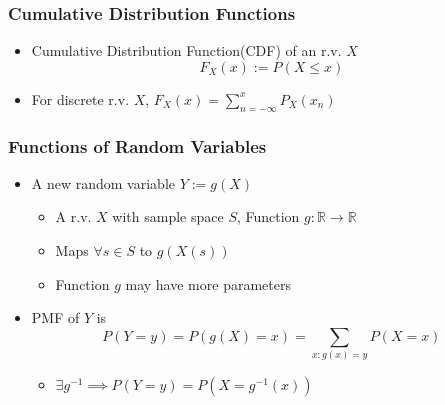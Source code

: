 \subsubsection*{Cumulative Distribution Functions}
\begin{itemize}
    \item Cumulative Distribution Function(CDF) of an r.v. $X$
    \begin{equation}
        F_X(x):=P(X\leq x)
    \end{equation}
    \item For discrete r.v. $X$, $F_X(x)=\sum_{n=-\infty}^{x}P_X(x_n)$
\end{itemize}

\subsubsection*{Functions of Random Variables}
\begin{itemize}
    \item A new random variable $Y:=g(X)$
    \begin{itemize}
        \item A r.v. $X$ with sample space $S$, Function $g:\mathbb{R}\to\mathbb{R}$
        \item Maps $\forall s\in S$ to $g(X(s))$
        \item Function $g$ may have more parameters
    \end{itemize}
    \item PMF of $Y$ is
    \begin{equation}
        P(Y=y)=P(g(X)=x)=\sum_{x:g(x)=y}P(X=x)
    \end{equation}
    \begin{itemize}
        \item $\exists g^{-1}\implies P(Y=y)=P(X=g^{-1}(x))$
    \end{itemize}
\end{itemize}

